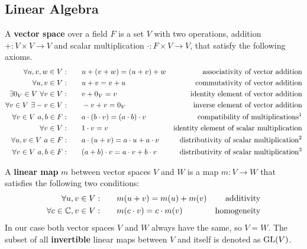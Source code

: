 \subsection{Linear Algebra}

A \textbf{vector space} over a field $F$ is a set $V$ with two operations, addition $+: V \times V \to V$ and scalar multiplication $\cdot: F \times V \to V$, that satisfy the following axioms.
\begin{subequations}
\begin{align}
    \forall u, v, w \in V: \qquad & u + (v + w) = (u + v) + w & \text{associativity of vector addition} \\
    \forall u, v \in V: \qquad & u + v = v + u & \text{commutativity of vector addition} \\
    \exists 0_V \in V\ \forall v \in V: \qquad & v + 0_V = v & \text{identity element of vector addition} \\
    \forall v \in V\ \exists -v \in V: \qquad & -v + v = 0_V & \text{inverse element of vector addition} \\
    \forall v \in V\ a, b \in F: \qquad & a \cdot (b \cdot v) = (a \cdot b) \cdot v & \text{compatibility of multiplications\footnotemark} \\
    \forall v \in V: \qquad & 1 \cdot v = v & \text{identity element of scalar multiplication} \\
    \forall u, v \in V\ a \in F: \qquad & a \cdot (u + v) = a \cdot u + a \cdot v & \text{distributivity of scalar multiplication\footnotemark} \\
    \forall v \in V\ a, b \in F: \qquad & (a + b) \cdot v = a \cdot v + b \cdot v & \text{distributivity of scalar multiplication\footnotemark}
\end{align}
\end{subequations}

A \textbf{linear map} $m$ between vector spaces $V$ and $W$ is a map $m: V \to W$ that satisfies the following two conditions:
\begin{subequations}
\begin{align}
    \forall u, v \in V: \qquad & m(u + v) = m(u) + m(v) & \text{additivity} \\
    \forall c \in \mathbb{C}, v \in V: \qquad & m(c \cdot v) = c \cdot m(v) & \text{homogeneity}
\end{align}
\end {subequations}
In our case both vector spaces $V$ and $W$ always have the same, so $V = W$.
The subset of all \textbf{invertible} linear maps between $V$ and itself is denoted as $\operatorname{GL}(V)$.
\\

